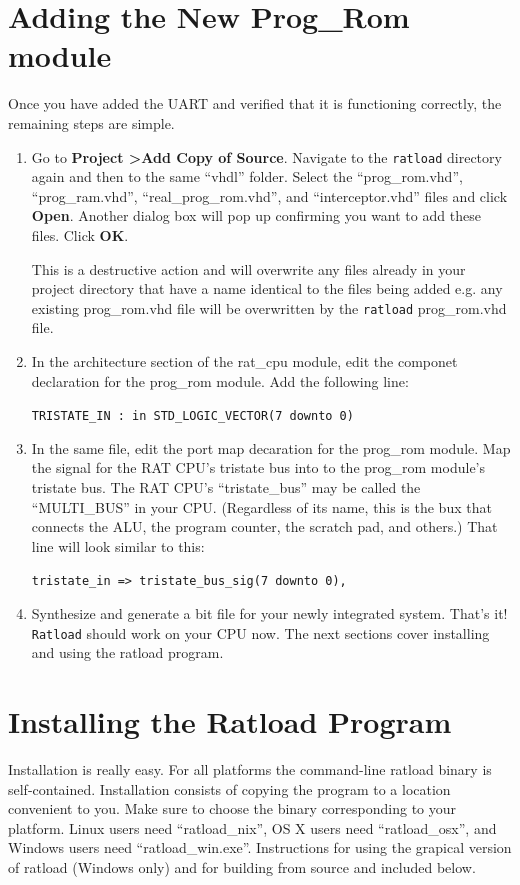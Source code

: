 \documentclass[notitlepage]{article}
\newcommand{\warningsign}{\fontencoding{U}\fontfamily{futs}\Large\selectfont\char 66\relax}
\begin{document}
\section{Adding the New Prog\_Rom module}
Once you have added the UART and verified that it is functioning correctly, the remaining steps are simple.
\begin{enumerate}
\item Go to \textbf{Project \textgreater Add Copy of Source}. Navigate to the \texttt{ratload} directory again and then to the same ``vhdl'' folder. Select the ``prog\_rom.vhd'', ``prog\_ram.vhd'', ``real\_prog\_rom.vhd'', and ``interceptor.vhd'' files and click \textbf{Open}. Another dialog box will pop up confirming you want to add these files. Click \textbf{OK}.

\begin{infobox}
  {\warningsign} This is a destructive action and will overwrite any files already in your project directory that have a name identical to the files being added e.g. any existing prog\_rom.vhd file will be overwritten by the \texttt{ratload} prog\_rom.vhd file.
\end{infobox}

\item In the architecture section of the rat\_cpu module, edit the componet declaration for the prog\_rom module. Add the following line:\\
  \centerline{\texttt{TRISTATE\_IN : in STD\_LOGIC\_VECTOR(7 downto 0)}}

\item In the same file, edit the port map decaration for the prog\_rom module. Map the signal for the RAT CPU's tristate bus into to the prog\_rom module's tristate bus. The RAT CPU's ``tristate\_bus'' may be called the ``MULTI\_BUS'' in your CPU. (Regardless of its name, this is the bux that connects the ALU, the program counter, the scratch pad, and others.) That line will look similar to this:\\
  \centerline{\texttt{tristate\_in =\textgreater ~tristate\_bus\_sig(7 downto 0),}}

\item Synthesize and generate a bit file for your newly integrated system. That's it! \texttt{Ratload} should work on your CPU now. The next sections cover installing and using the ratload program.
\end{enumerate}

\section{Installing the Ratload Program}
Installation is really easy. For all platforms the command-line ratload binary is self-contained. Installation consists of copying the program to a location convenient to you. Make sure to choose the binary corresponding to your platform. Linux users need ``ratload\_nix'', OS X users need ``ratload\_osx'', and Windows users need ``ratload\_win.exe''. Instructions for using the grapical version of ratload (Windows only) and for building from source and included below.
\end{document}
